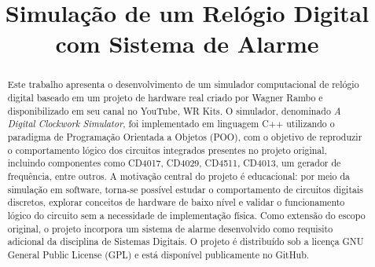 \documentclass[conference]{IEEEtran}
\begin{document}
\title{Simulação de um Relógio Digital com Sistema de Alarme}

\author{

\and


\and


\and

}

\maketitle

\begin{abstract}
Este trabalho apresenta o desenvolvimento de um simulador computacional de relógio digital baseado em um projeto de hardware real criado por Wagner Rambo e disponibilizado em seu canal no YouTube, WR Kits. O simulador, denominado \textit{A Digital Clockwork Simulator}, foi implementado em linguagem C++ utilizando o paradigma de Programação Orientada a Objetos (POO), com o objetivo de reproduzir o comportamento lógico dos circuitos integrados presentes no projeto original, incluindo componentes como CD4017, CD4029, CD4511, CD4013, um gerador de frequência, entre outros. A motivação central do projeto é educacional: por meio da simulação em software, torna-se possível estudar o comportamento de circuitos digitais discretos, explorar conceitos de hardware de baixo nível e validar o funcionamento lógico do circuito sem a necessidade de implementação física. Como extensão do escopo original, o projeto incorpora um sistema de alarme desenvolvido como requisito adicional da disciplina de Sistemas Digitais. O projeto é distribuído sob a licença GNU General Public License (GPL) e está disponível publicamente no GitHub.
\end{abstract}
\end{document}
